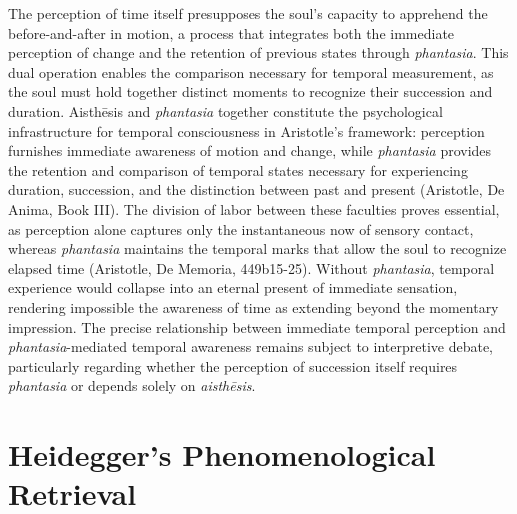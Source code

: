 \documentclass[12pt,a4paper]{article}
\begin{document}
The perception of time itself presupposes the soul's capacity to apprehend the before-and-after in motion, a process that integrates both the immediate perception of change and the retention of previous states through \textit{phantasia}. This dual operation enables the comparison necessary for temporal measurement, as the soul must hold together distinct moments to recognize their succession and duration. Aisthēsis and \textit{phantasia} together constitute the psychological infrastructure for temporal consciousness in Aristotle's framework: perception furnishes immediate awareness of motion and change, while \textit{phantasia} provides the retention and comparison of temporal states necessary for experiencing duration, succession, and the distinction between past and present (Aristotle, De Anima, Book III). The division of labor between these faculties proves essential, as perception alone captures only the instantaneous now of sensory contact, whereas \textit{phantasia} maintains the temporal marks that allow the soul to recognize elapsed time (Aristotle, De Memoria, 449b15-25). Without \textit{phantasia}, temporal experience would collapse into an eternal present of immediate sensation, rendering impossible the awareness of time as extending beyond the momentary impression. The precise relationship between immediate temporal perception and \textit{phantasia}-mediated temporal awareness remains subject to interpretive debate, particularly regarding whether the perception of succession itself requires \textit{phantasia} or depends solely on \textit{aisthēsis}.


\section{Heidegger's Phenomenological Retrieval}
\end{document}
